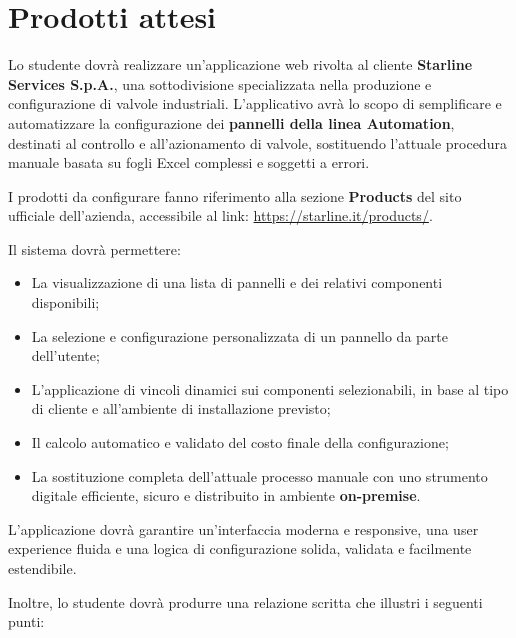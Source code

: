 \section*{Prodotti attesi}

Lo studente dovrà realizzare un'applicazione web rivolta al cliente \textbf{Starline Services S.p.A.}, una sottodivisione specializzata nella produzione e configurazione di valvole industriali. L'applicativo avrà lo scopo di semplificare e automatizzare la configurazione dei \textbf{pannelli della linea Automation}, destinati al controllo e all’azionamento di valvole, sostituendo l'attuale procedura manuale basata su fogli Excel complessi e soggetti a errori.

I prodotti da configurare fanno riferimento alla sezione \textbf{Products} del sito ufficiale dell’azienda, accessibile al link: \url{https://starline.it/products/}.

Il sistema dovrà permettere:

\begin{itemize}
    \item La visualizzazione di una lista di pannelli e dei relativi componenti disponibili;
    \item La selezione e configurazione personalizzata di un pannello da parte dell’utente;
    \item L'applicazione di vincoli dinamici sui componenti selezionabili, in base al tipo di cliente e all’ambiente di installazione previsto;
    \item Il calcolo automatico e validato del costo finale della configurazione;
    \item La sostituzione completa dell’attuale processo manuale con uno strumento digitale efficiente, sicuro e distribuito in ambiente \textbf{on-premise}.
\end{itemize}

L’applicazione dovrà garantire un’interfaccia moderna e responsive, una user experience fluida e una logica di configurazione solida, validata e facilmente estendibile.

\bigskip

Inoltre, lo studente dovrà produrre una relazione scritta che illustri i seguenti punti:

